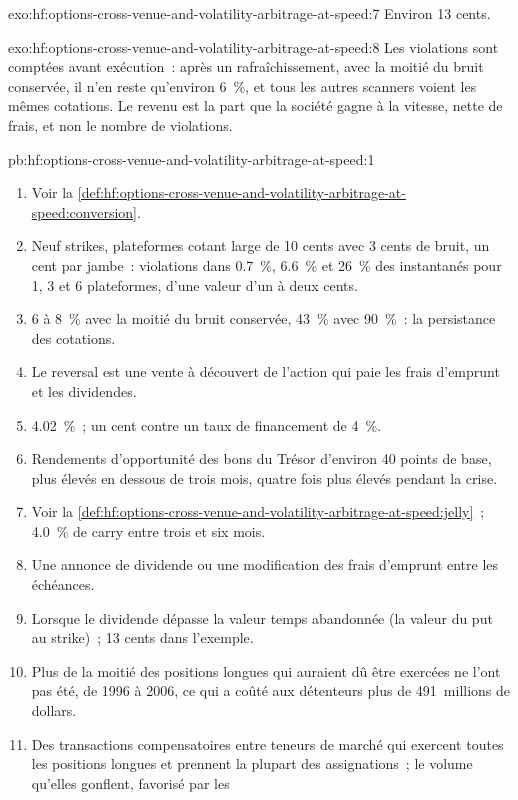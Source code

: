 \begin{solution}{exo:hf:options-cross-venue-and-volatility-arbitrage-at-speed:7}
Environ 13 cents.
\end{solution}

\begin{solution}{exo:hf:options-cross-venue-and-volatility-arbitrage-at-speed:8}
Les violations sont comptées avant exécution~: après un rafraîchissement, avec la moitié du bruit conservée, il n'en reste qu'environ 6~\%, et tous les autres scanners voient les mêmes
cotations. Le revenu est la part que la société gagne à la vitesse, nette de frais, et non le nombre de violations.
\end{solution}

\begin{solution}{pb:hf:options-cross-venue-and-volatility-arbitrage-at-speed:1}
\begin{enumerate}
\item Voir la \cref{def:hf:options-cross-venue-and-volatility-arbitrage-at-speed:conversion}.
\item Neuf strikes, plateformes cotant large de 10 cents avec 3 cents de bruit, un cent par jambe~: violations dans 0.7~\%, 6.6~\% et 26~\% des instantanés pour 1, 3 et 6
plateformes, d'une valeur d'un à deux cents.
\item 6 à 8~\% avec la moitié du bruit conservée, 43~\% avec 90~\%~: la persistance des cotations.
\item Le reversal est une vente à découvert de l'action qui paie les frais d'emprunt et les dividendes.
\item 4.02~\%~; un cent contre un taux de financement de 4~\%.
\item Rendements d'opportunité des bons du Trésor d'environ 40 points de base, plus élevés en dessous de trois mois, quatre fois plus élevés pendant la crise.
\item Voir la \cref{def:hf:options-cross-venue-and-volatility-arbitrage-at-speed:jelly}~; 4.0~\% de carry entre trois et six mois.
\item Une annonce de dividende ou une modification des frais d'emprunt entre les échéances.
\item Lorsque le dividende dépasse la valeur temps abandonnée (la valeur du put au strike)~; 13 cents dans l'exemple.
\item Plus de la moitié des positions longues qui auraient dû être exercées ne l'ont pas été, de 1996 à 2006, ce qui a coûté aux détenteurs plus de 491~millions de dollars.
\item Des transactions compensatoires entre teneurs de marché qui exercent toutes les positions longues et prennent la plupart des assignations~; le volume qu'elles gonflent, favorisé par les

\end{enumerate}
\end{solution}
